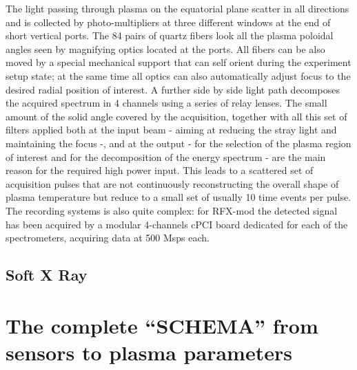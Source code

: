 The light passing through plasma on the equatorial plane scatter in all directions and is collected by photo-multipliers at three different windows at the end of short vertical ports. The 84 pairs of quartz fibers look all the plasma poloidal angles seen by magnifying optics located at the ports. All fibers can be also moved by a special mechanical support that can self orient during the experiment setup state; at the same time all optics can also automatically adjust focus to the desired radial position of interest.
A further side by side light path decomposes the acquired spectrum in 4 channels using a series of relay lenses.
%
The small amount of the solid angle covered by the acquisition, together with all this set of filters applied both at the input beam - aiming at reducing the stray light and maintaining the focus -, and at the output - for the selection of the plasma region of interest and for the decomposition of the energy spectrum - are the main reason for the required high power input.
%
This leads to a scattered set of acquisition pulses that are not continuously reconstructing the overall shape of plasma temperature but reduce to a small set of usually 10 time events per pulse.
%
The recording systems is also quite complex: for RFX-mod the detected signal has been acquired by a modular 4-channels cPCI board dedicated for each of the spectrometers, acquiring data at 500 Msps each.

\subsection{Soft X Ray}




\section{The complete “SCHEMA” from sensors to plasma parameters}
